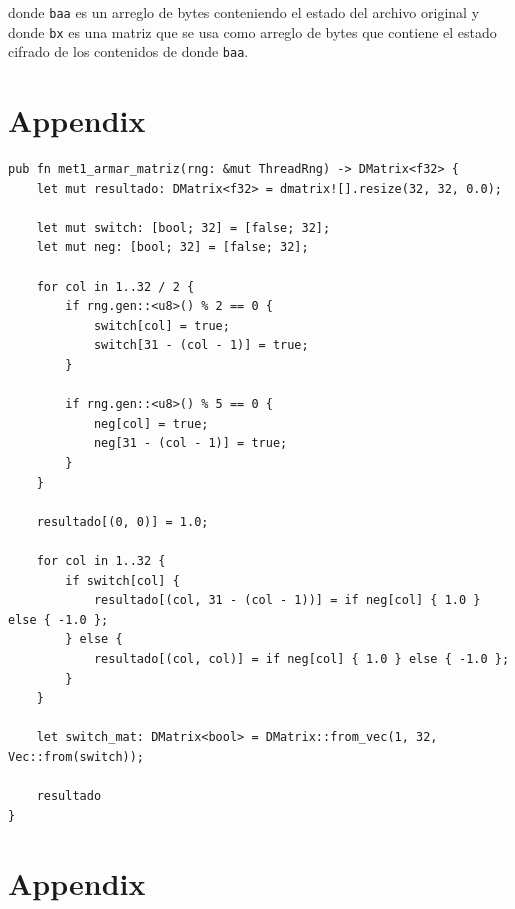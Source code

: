 \documentclass[a4paper]{article}
\begin{document}
donde \texttt{baa} es un arreglo de bytes conteniendo el estado del archivo
original y donde \texttt{bx} es una matriz que se usa como arreglo de bytes que
contiene el estado cifrado de los contenidos de donde \texttt{baa}.

\newpage
\section{Appendix}

\begin{verbatim}
pub fn met1_armar_matriz(rng: &mut ThreadRng) -> DMatrix<f32> {
    let mut resultado: DMatrix<f32> = dmatrix![].resize(32, 32, 0.0);

    let mut switch: [bool; 32] = [false; 32];
    let mut neg: [bool; 32] = [false; 32];

    for col in 1..32 / 2 {
        if rng.gen::<u8>() % 2 == 0 {
            switch[col] = true;
            switch[31 - (col - 1)] = true;
        }

        if rng.gen::<u8>() % 5 == 0 {
            neg[col] = true;
            neg[31 - (col - 1)] = true;
        }
    }

    resultado[(0, 0)] = 1.0;

    for col in 1..32 {
        if switch[col] {
            resultado[(col, 31 - (col - 1))] = if neg[col] { 1.0 } else { -1.0 };
        } else {
            resultado[(col, col)] = if neg[col] { 1.0 } else { -1.0 };
        }
    }

    let switch_mat: DMatrix<bool> = DMatrix::from_vec(1, 32, Vec::from(switch));

    resultado
}
\end{verbatim}

\newpage
\section{Appendix}
\end{document}
